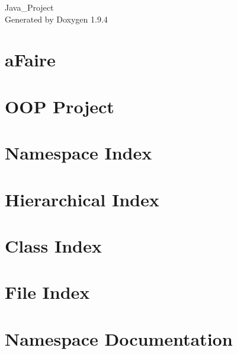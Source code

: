 \documentclass[twoside]{book}
\newcommand{\+}{\discretionary{\mbox{\scriptsize$\hookleftarrow$}}{}{}}
\newcommand{\clearemptydoublepage}{%
    \newpage{\pagestyle{empty}\cleardoublepage}%
  }
\begin{document}
  \raggedbottom
    \hypersetup{pageanchor=false,
                bookmarksnumbered=true,
                pdfencoding=unicode
               }
  \begin{titlepage}
  \vspace*{7cm}
  \begin{center}%
  {\Large Java\+\_\+\+Project}\\
  \vspace*{1cm}
  {\large Generated by Doxygen 1.9.4}\\
  \end{center}
  \end{titlepage}
  \clearemptydoublepage
  \tableofcontents
  \clearemptydoublepage
  \hypersetup{pageanchor=true}
\chapter{a\+Faire}
\label{md_a_faire}

\chapter{OOP Project}
\label{md__r_e_a_d_m_e}

\chapter{Namespace Index}

\chapter{Hierarchical Index}

\chapter{Class Index}

\chapter{File Index}

\chapter{Namespace Documentation}










\end{document}
